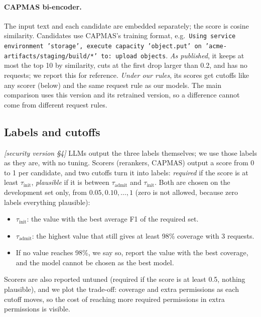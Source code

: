 \documentclass[10pt]{article}
\newcommand{\M}[1]{\textit{[security version #1]}}
\begin{document}
\paragraph{CAPMAS bi-encoder.} The input text and each candidate are embedded separately; the score is cosine similarity.
Candidates use CAPMAS's training format, e.g.\ \texttt{Using service environment 'storage', execute capacity 'object.put'
on 'acme-artifacts/staging/build/*' to: upload objects}. \emph{As published}, it keeps at most the top 10 by similarity,
cuts at the first drop larger than 0.2, and has no requests; we report this for reference. \emph{Under our rules}, its
scores get cutoffs like any scorer (below) and the same request rule as our models. The main comparison uses this
version and its retrained version, so a difference cannot come from different request rules.

\subsection{Labels and cutoffs}\label{sec:cutoffs}
\M{\S4}
LLMs output the three labels themselves; we use those labels as they are, with no tuning. Scorers (rerankers, CAPMAS)
output a score from 0 to 1 per candidate, and two cutoffs turn it into labels: \emph{required} if the score is at least
$\tau_{\mathrm{init}}$, \emph{plausible} if it is between $\tau_{\mathrm{admit}}$ and $\tau_{\mathrm{init}}$. Both are chosen
on the development set only, from $0.05, 0.10, \dots, 1$ (zero is not allowed, because zero labels everything plausible):
\begin{itemize}
  \item $\tau_{\mathrm{init}}$: the value with the best average F1 of the required set.
  \item $\tau_{\mathrm{admit}}$: the highest value that still gives at least 98\% coverage with 3 requests.
  \item If no value reaches 98\%, we say so, report the value with the best coverage, and the model cannot be chosen as
    the best model.
\end{itemize}
Scorers are also reported untuned (required if the score is at least 0.5, nothing plausible), and we plot the trade-off:
coverage and extra permissions as each cutoff moves, so the cost of reaching more required permissions in extra
permissions is visible.
\end{document}
